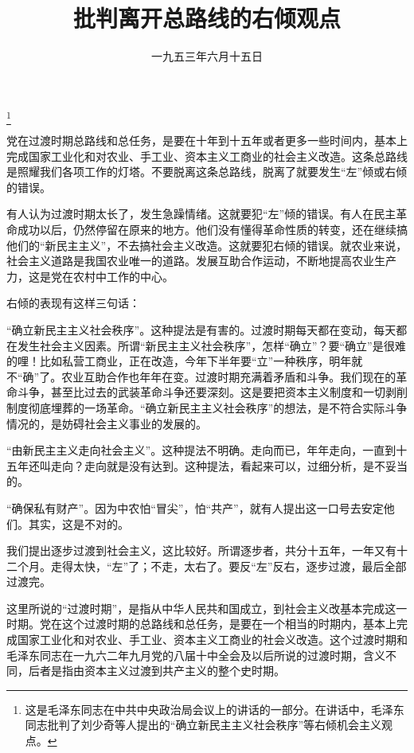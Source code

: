 
\title{批判离开总路线的右倾观点}
\date{一九五三年六月十五日}
\thanks{这是毛泽东同志在中共中央政治局会议上的讲话的一部分。在讲话中，毛泽东同志批判了刘少奇等人提出的“确立新民主主义社会秩序”等右倾机会主义观点。}
\maketitle


党在过渡时期总路线和总任务，是要在十年到十五年或者更多一些时间内，基本上完成国家工业化和对农业、手工业、资本主义工商业的社会主义改造。这条总路线是照耀我们各项工作的灯塔。不要脱离这条总路线，脱离了就要发生“左”倾或右倾的错误。

有人认为过渡时期太长了，发生急躁情绪。这就要犯“左”倾的错误。有人在民主革命成功以后，仍然停留在原来的地方。他们没有懂得革命性质的转变，还在继续搞他们的“新民主主义”，不去搞社会主义改造。这就要犯右倾的错误。就农业来说，社会主义道路是我国农业唯一的道路。发展互助合作运动，不断地提高农业生产力，这是党在农村中工作的中心。

右倾的表现有这样三句话：

“确立新民主主义社会秩序”。这种提法是有害的。过渡时期每天都在变动，每天都在发生社会主义因素。所谓“新民主主义社会秩序”，怎样“确立”？要“确立”是很难的哩！比如私营工商业，正在改造，今年下半年要“立”一种秩序，明年就不“确”了。农业互助合作也年年在变。过渡时期充满着矛盾和斗争。我们现在的革命斗争，甚至比过去的武装革命斗争还要深刻。这是要把资本主义制度和一切剥削制度彻底埋葬的一场革命。“确立新民主主义社会秩序”的想法，是不符合实际斗争情况的，是妨碍社会主义事业的发展的。

“由新民主主义走向社会主义”。这种提法不明确。走向而已，年年走向，一直到十五年还叫走向？走向就是没有达到。这种提法，看起来可以，过细分析，是不妥当的。

“确保私有财产”。因为中农怕“冒尖”，怕“共产”，就有人提出这一口号去安定他们。其实，这是不对的。

我们提出逐步过渡到社会主义，这比较好。所谓逐步者，共分十五年，一年又有十二个月。走得太快，“左”了；不走，太右了。要反“左”反右，逐步过渡，最后全部过渡完。


\begin{maonote}
这里所说的“过渡时期”，是指从中华人民共和国成立，到社会主义改基本完成这一时期。党在这个过渡时期的总路线和总任务，是要在一个相当的时期内，基本上完成国家工业化和对农业、手工业、资本主义工商业的社会义改造。这个过渡时期和毛泽东同志在一九六二年九月党的八届十中全会及以后所说的过渡时期，含义不同，后者是指由资本主义过渡到共产主义的整个史时期。
\end{maonote}
